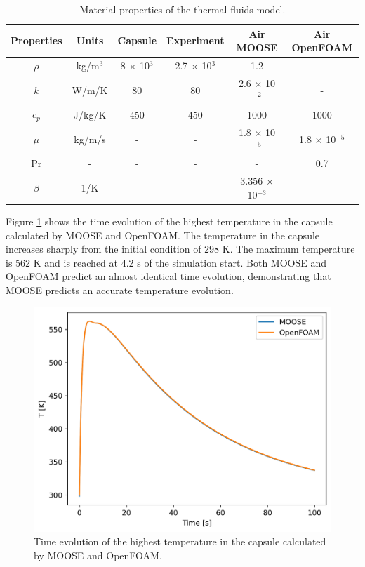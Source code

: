 \begin{table}[htbp!]
  \centering
  \caption{Material properties of the thermal-fluids model.}
  \label{tab:tf-mat}
  \begin{tabular}{cccccc}
    \toprule
      Properties & Units    & Capsule              & Experiment            & Air MOOSE                & Air OpenFOAM \\
    \midrule
      $\rho$     & kg/m$^3$ & 8 $\times$ 10$^{3}$  & 2.7 $\times$ 10$^{3}$ & 1.2                      & - \\
      $k$        & W/m/K    & 80                   & 80                    & 2.6 $\times$ 10$^{-2}$   & - \\
      $c_p$      & J/kg/K   & 450                  & 450                   & 1000                     & 1000 \\
      $\mu$      & kg/m/s   & -                    & -                     & 1.8 $\times$ 10$^{-5}$   & 1.8 $\times$ 10$^{-5}$ \\
      Pr         & -        & -                    & -                     & -                        & 0.7 \\
      $\beta$    & 1/K      & -                    & -                     & 3.356 $\times$ 10$^{-3}$ & - \\
    \bottomrule
  \end{tabular}
\end{table}

Figure \ref{fig:tf-val} shows the time evolution of the highest temperature in the capsule calculated by MOOSE and OpenFOAM.
The temperature in the capsule increases sharply from the initial condition of 298 K.
The maximum temperature is 562 K and is reached at 4.2 s of the simulation start.
Both MOOSE and OpenFOAM predict an almost identical time evolution, demonstrating that MOOSE predicts an accurate temperature evolution.

\begin{figure}[htbp!] %
    \centering
    \includegraphics[width=0.45\linewidth]{figures/verification}
    \hfill
    \caption{Time evolution of the highest temperature in the capsule calculated by MOOSE and OpenFOAM.}
    \label{fig:tf-val}
\end{figure}

